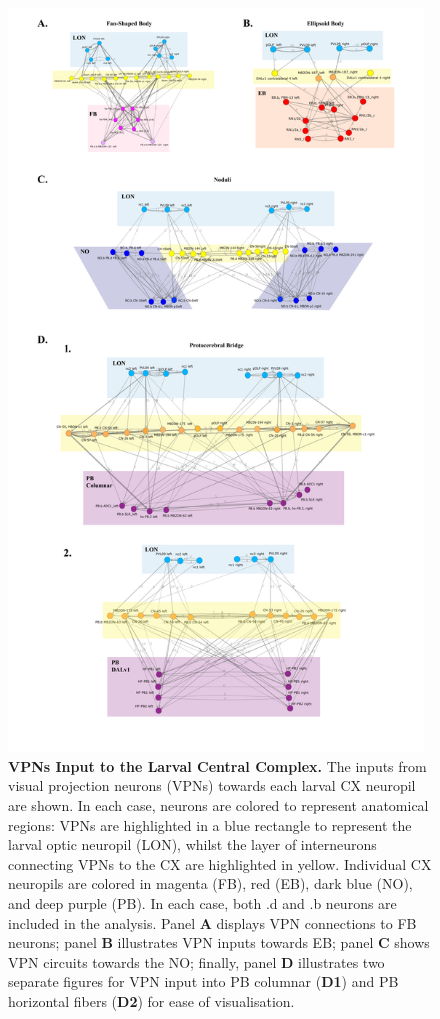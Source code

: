     \begin{figure}[H]
        \centering
        \includegraphics[width=11cm]{Figs/CX/VPNstoCX.pdf}
        \caption[Visual Inputs via VPNs to larval Central Complex Neuropils]{\textbf{VPNs Input to the Larval Central Complex.} The inputs from visual projection neurons (VPNs) towards each larval CX neuropil are shown. In each case, neurons are colored to represent anatomical regions: VPNs are highlighted in a blue rectangle to represent the larval optic neuropil (LON), whilst the layer of interneurons connecting VPNs to the CX are highlighted in yellow. Individual CX neuropils are colored in magenta (FB), red (EB), dark blue (NO), and deep purple (PB). In each case, both .d and .b neurons are included in the analysis. Panel \textbf{A} displays VPN connections to FB neurons; panel \textbf{B} illustrates VPN inputs towards EB; panel \textbf{C} shows VPN circuits towards the NO; finally, panel \textbf{D} illustrates two separate figures for VPN input into PB columnar (\textbf{D1}) and PB horizontal fibers (\textbf{D2}) for ease of visualisation.}
        \label{VPNs}
    \end{figure}

